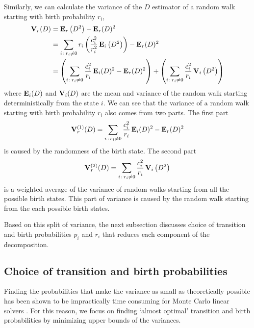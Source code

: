 \documentclass[a4paper,11pt]{article}
\theoremstyle{remark}
\theoremstyle{definition}
\begin{document}
        Similarly, we can calculate the variance of the $D$ estimator of a
        random walk starting with birth probability $r_i$,
        \begin{equation} \label{splitbirth} \begin{split}
            {\bf V}_r(D)
            &= {\bf E}_r\left(D^2\right) - {\bf E}_r(D)^2 \\
            &= \sum_{i\,:\,r_i\ne0} r_i\left(\frac{c_i^2}{r_i^2}\,
               {\bf E}_i\left(D^2\right)\right) - {\bf E}_r(D)^2 \\
            &= \left(\sum_{i\,:\,r_i\ne0} \frac{c_i^2}{r_i}\,
                     {\bf E}_i(D)^2 - {\bf E}_r(D)^2\right)
               + \left( \sum_{i\,:\,r_i\ne0} \frac{c_i^2}{r_i}\,
                       {\bf V}_i\left(D^2\right) \right)
        \end{split} \end{equation}
        where ${\bf E}_i(D)$ and ${\bf V}_i(D)$ are the mean and variance
        of the random walk starting deterministically from the state $i$.
        We can see that the variance of a random walk starting with birth
        probability $r_i$ also comes from two parts. The first part
        \begin{equation} \label{part1birth}
            {\bf V}_r^{(1)}(D) = 
            \sum_{i\,:\,r_i\ne0} \frac{c_i^2}{r_i}\, {\bf E}_i(D)^2
             - {\bf E}_r(D)^2
        \end{equation}
        is caused by the randomness of the birth state.  The second part
        \begin{equation} \label{part2birth}
            {\bf V}_r^{(2)}(D) = 
            \sum_{i\,:\,r_i\ne0} \frac{c_i^2}{r_i}\, {\bf V}_i\left(D^2\right)
        \end{equation}
        is a weighted average of the variance of random walks starting from
        all the possible birth states.  This part of variance is caused by
        the random walk starting from the each possible birth states.
        
        Based on this split of variance, the next subsection discusses
        choice of transition and birth probabilities $p_i$ and $r_i$ that
        reduces each component of the decomposition.
    


    \subsection{Choice of transition and birth probabilities}
        Finding the probabilities that make the variance as small as
        theoretically possible has been shown to be impractically time
        consuming for Monte Carlo linear solvers \cite{Dimov1991,Dimov1993}.
        For this reason, we focus on finding `almost optimal' transition
        and birth probabilities by minimizing upper bounds of the variances.
\end{document}
